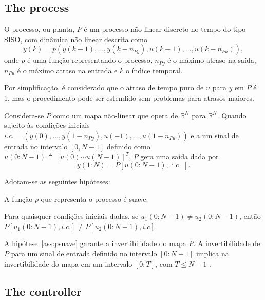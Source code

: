\subsection{The process}%
\label{sec:TheProcess}

O processo, ou planta, $P$ é um processo não-linear discreto no tempo do tipo SISO, com dinâmica não linear descrita como
\begin{equation}
   y(k)=p\left(y(k-1), \ldots, y(k-n_{P y}), u(k-1), \ldots, u(k-n_{P u})\right),
   \label{eq:yknl}
\end{equation}
onde $p$ é uma função representando o processo, $n_{P y}$ é o máximo atraso na saída, $n_{P u}$ é o máximo atraso na entrada e $k$ o índice temporal.

Por simplificação, é considerado que o atraso de tempo puro de $u$ para $y$ em $P$ é 1, mas o procedimento pode ser estendido sem problemas para atrasos maiores.

Considera-se $P$ como um mapa não-linear que opera de $\mathbb{R}^{N}$ para $\mathbb{R}^{N}$. Quando sujeito às condições iniciais $i.c.= (y(0), \ldots, y(1-n_{P y}), u(-1), \ldots, u(1-n_{P u}) )$ e a um sinal de entrada no intervalo $[0, N-1]$ definido como $u(0{:}N-1) \triangleq [u(0) \cdots u(N-1)]^{T}$, $P$ gera uma saída dada por
\begin{equation}
   y(1{:}N) = P[u(0{:}N-1), \text { i.c. }].
\label{eq:Pnl}
\end{equation}

Adotam-se as seguintes hipóteses:
\begin{assum}\label{ass:psuave}
   A função $p$ que representa o processo é suave.
\end{assum}
\begin{assum}\label{ass:invert}
   Para quaisquer condições iniciais dadas, se $u_{1}(0{:}N-1) \neq u_{2}(0{:} N-1)$, então $P\left[u_{1}(0{:} N-1), i . c .\right] \neq P\left[u_{2}(0{:} N-1), i . c\right]$.
\end{assum}

A hipótese~\ref{ass:psuave} garante a invertibilidade do mapa $P$. A invertibilidade de $P$ para um sinal de entrada definido no intervalo $\left[ 0{:}N-1 \right]$
implica na invertibilidade do mapa em um intervalo $[0{:}T]$, com $T\le N-1$ \citep{campi2004}. 


\subsection{The controller}%
\label{sub:o_controlador}

